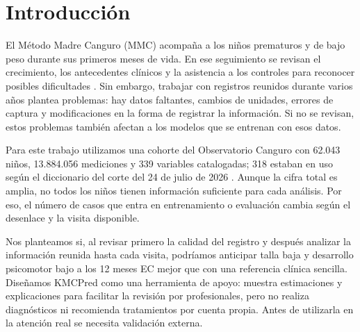 \section{Introducción}
\label{sec:introduccion}

El Método Madre Canguro (MMC) acompaña a los niños prematuros y de bajo peso durante sus primeros meses de vida. En ese seguimiento se revisan el crecimiento, los antecedentes clínicos y la asistencia a los controles para reconocer posibles dificultades \cite{r1,r2,r3}. Sin embargo, trabajar con registros reunidos durante varios años plantea problemas: hay datos faltantes, cambios de unidades, errores de captura y modificaciones en la forma de registrar la información. Si no se revisan, estos problemas también afectan a los modelos que se entrenan con esos datos.

Para este trabajo utilizamos una cohorte del Observatorio Canguro con 62.043 niños, 13.884.056 mediciones y 339 variables catalogadas; 318 estaban en uso según el diccionario del corte del 24 de julio de 2026 \cite{r4}. Aunque la cifra total es amplia, no todos los niños tienen información suficiente para cada análisis. Por eso, el número de casos que entra en entrenamiento o evaluación cambia según el desenlace y la visita disponible.

Nos planteamos si, al revisar primero la calidad del registro y después analizar la información reunida hasta cada visita, podríamos anticipar talla baja y desarrollo psicomotor bajo a los 12 meses EC mejor que con una referencia clínica sencilla. Diseñamos KMCPred como una herramienta de apoyo: muestra estimaciones y explicaciones para facilitar la revisión por profesionales, pero no realiza diagnósticos ni recomienda tratamientos por cuenta propia. Antes de utilizarla en la atención real se necesita validación externa.
